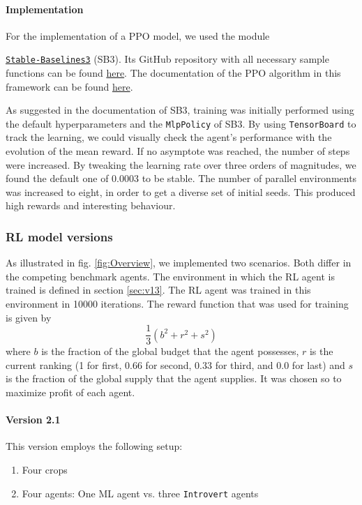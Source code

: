 \documentclass[a4paper,12pt]{article} %
\begin{document}
\paragraph{Implementation}
For the implementation of a PPO model, we used the module 

\href{https://stable-baselines3.readthedocs.io/en/master/index.html}{\texttt{Stable-Baselines3}} (SB3).  Its GitHub repository with all necessary sample functions can be found \href{https://github.com/DLR-RM/stable-baselines3}{here}.
The documentation of the PPO algorithm in this framework can be found \href{https://stable-baselines3.readthedocs.io/en/master/modules/ppo.html}{here}.

As suggested in the documentation of SB3, training was initially performed using the default hyperparameters and the \texttt{MlpPolicy} of SB3. By using \texttt{TensorBoard} to track the learning, we could visually check the agent's performance with the evolution of the mean reward. If no asymptote was reached, the number of steps were increased. By tweaking the learning rate over three orders of magnitudes, we found the default one of 0.0003 to be stable. The number of parallel environments was increased to eight, in order to get a diverse set of initial seeds. This produced high rewards and interesting behaviour.

\newpage

\subsubsection{RL model versions}
As illustrated in fig. \ref{fig:Overview}, we implemented two scenarios. Both differ in the competing benchmark agents. The environment in which the RL agent is trained is defined in section \ref{sec:v13}. The RL agent was trained in this environment in 10000 iterations. The reward function that was used for training is given by
\begin{equation}
    \frac{1}{3}(b^2 + r^2 + s^2)
\end{equation}
where $b$ is the fraction of the global budget that the agent possesses, $r$ is
the current ranking (1 for first, $0.66$ for second, $0.33$ for third, and
$0.0$ for last) and $s$ is the fraction of the global supply that the agent
supplies. It was chosen so to maximize profit of each agent.

\paragraph{Version 2.1}
This version employs the following setup:
\begin{enumerate}
    \item Four crops
    \item Four agents: One ML agent vs. three \texttt{Introvert} agents
\end{enumerate}
\end{document}

